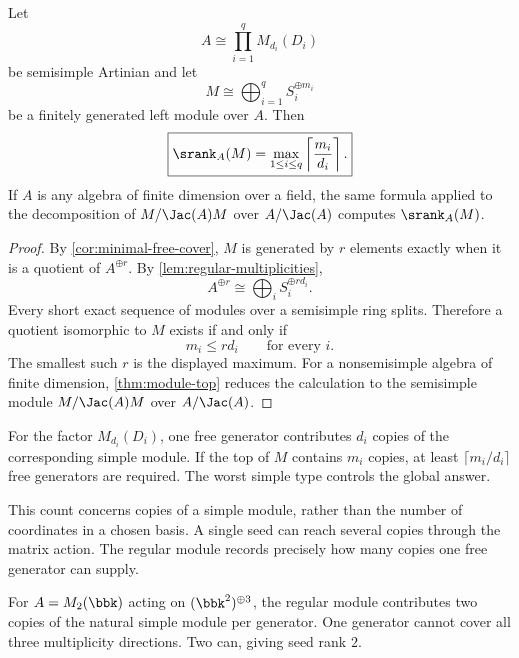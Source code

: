 \begin{theorem}
\label{thm:semisimple-seed-rank}
Let
\[
A\cong\prod_{i=1}^{q}M_{d_i}(D_i)
\]
be semisimple Artinian and let
\[
M\cong\bigoplus_{i=1}^{q}S_i^{\oplus m_i}
\]
be a finitely generated left module over $A$.  Then
\[
\boxed{
\srank_A(M)
=
\max_{1\leq i\leq q}
\left\lceil\frac{m_i}{d_i}\right\rceil.
}
\]
If $A$ is any algebra of finite dimension over a field, the same formula applied to the decomposition of $M/\Jac(A)M$ over $A/\Jac(A)$ computes $\srank_A(M)$.
\end{theorem}

\begin{proof}
By \cref{cor:minimal-free-cover}, $M$ is generated by $r$ elements exactly when it is a quotient of $A^{\oplus r}$.  By \cref{lem:regular-multiplicities},
\[
A^{\oplus r}\cong\bigoplus_iS_i^{\oplus rd_i}.
\]
Every short exact sequence of modules over a semisimple ring splits.  Therefore a quotient isomorphic to $M$ exists if and only if
\[
m_i\leq rd_i
\qquad\text{for every }i.
\]
The smallest such $r$ is the displayed maximum.  For a nonsemisimple algebra of finite dimension, \cref{thm:module-top} reduces the calculation to the semisimple module $M/\Jac(A)M$ over $A/\Jac(A)$.
\end{proof}

\begin{interpretation}
For the factor \(M_{d_i}(D_i)\), one free generator contributes \(d_i\) copies of the corresponding simple module.  If the top of \(M\) contains \(m_i\) copies, at least \(\lceil m_i/d_i\rceil\) free generators are required.  The worst simple type controls the global answer.

This count concerns copies of a simple module, rather than the number of coordinates in a chosen basis.  A single seed can reach several copies through the matrix action.  The regular module records precisely how many copies one free generator can supply.
\end{interpretation}

\begin{microexample}[title={Multiplicity consumes seed capacity}]
For \(A=M_2(\bbk)\) acting on \((\bbk^2)^{\oplus3}\), the regular module contributes two copies of the natural simple module per generator.  One generator cannot cover all three multiplicity directions.  Two can, giving seed rank \(2\).
\end{microexample}


